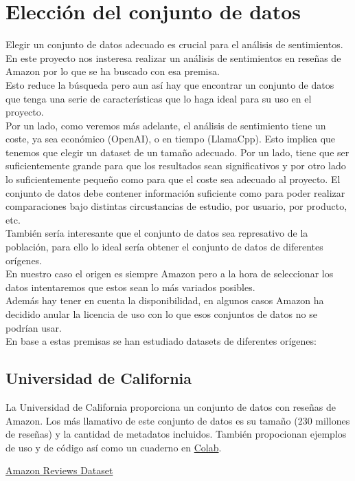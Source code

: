 \section{Elección del conjunto de datos}

Elegir un conjunto de datos adecuado es crucial para el análisis de sentimientos.
En este proyecto nos insteresa realizar un análisis de sentimientos en reseñas de 
Amazon por lo que se ha buscado con esa premisa. \\
Esto reduce la búsqueda pero aun así hay que encontrar 
un conjunto de datos que tenga una serie de características que lo haga ideal para su uso en el proyecto.\\
Por un lado, como veremos más adelante, el análisis de sentimiento tiene un coste, 
ya sea económico (OpenAI), o en tiempo (LlamaCpp).
Esto implica que tenemos que elegir un dataset de un tamaño adecuado.
Por un lado, tiene que ser suficientemente grande para que los resultados sean significativos y 
por otro lado lo suficientemente pequeño como para que el coste sea adecuado al proyecto.
El conjunto de datos debe contener información suficiente como para poder realizar 
comparaciones bajo distintas circustancias de estudio, por usuario, por producto, etc.\\
También sería interesante que el conjunto de datos sea represativo de la población, 
para ello lo ideal sería obtener el conjunto de datos de diferentes orígenes.\\
En nuestro caso el origen es siempre Amazon pero a la hora de seleccionar los datos 
intentaremos que estos sean lo más variados posibles.\\
Además hay tener en cuenta la disponibilidad, en algunos casos Amazon ha decidido anular 
la licencia de uso con lo que esos conjuntos de datos no se podrían usar.\\
En base a estas premisas se han estudiado datasets de diferentes orígenes:

\subsection{Universidad de California~\cite{jin018}}
La Universidad de California proporciona un conjunto de datos con reseñas de Amazon. Los más llamativo de este conjunto de datos es su tamaño (230 millones de reseñas) y la cantidad de metadatos incluidos.
También propocionan ejemplos de uso y de código así como un cuaderno en \href{https://colab.research.google.com/drive/1Zv6MARGQcrBbLHyjPVVMZVnRWsRnVMpV}{Colab}.
\par
\href{https://cseweb.ucsd.edu/~jmcauley/datasets/amazon_v2/}{Amazon Reviews Dataset}

